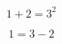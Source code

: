 \documentclass{article}
\begin{document}
    \begin{equation}
        1 + 2 = 3^2
    \end{equation}

    \begin{equation}
        1 = 3 - 2
    \end{equation}
\end{document}

